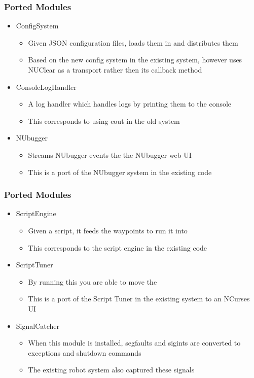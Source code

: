 \documentclass{beamer}
\begin{document}
\begin{frame}
	\frametitle{Ported Modules}
	\begin{itemize}
		\item ConfigSystem
			\begin{itemize}
				\item Given JSON configuration files, loads them in and distributes them
				\item Based on the new config system in the existing system, however uses NUClear as a transport rather then its callback method
			\end{itemize}

		\item ConsoleLogHandler
			\begin{itemize}
				\item A log handler which handles logs by printing them to the console
				\item This corresponds to using cout in the old system
			\end{itemize}

		\item NUbugger
			\begin{itemize}
				\item Streams NUbugger events the the NUbugger web UI
				\item This is a port of the NUbugger system in the existing code
			\end{itemize}
		\end{itemize}
\end{frame}

\begin{frame}
	\frametitle{Ported Modules}
	\begin{itemize}
		\item ScriptEngine
			\begin{itemize}
				\item Given a script, it feeds the waypoints to run it into
				\item This corresponds to the script engine in the existing code
			\end{itemize}

		\item ScriptTuner
			\begin{itemize}
				\item By running this you are able to move the
				\item This is a port of the Script Tuner in the existing system to an NCurses UI
			\end{itemize}

		\item SignalCatcher
			\begin{itemize}
				\item When this module is installed, segfaults and sigints are converted to exceptions and shutdown commands
				\item The existing robot system also captured these signals
			\end{itemize}
	\end{itemize}
\end{frame}
\end{document}
